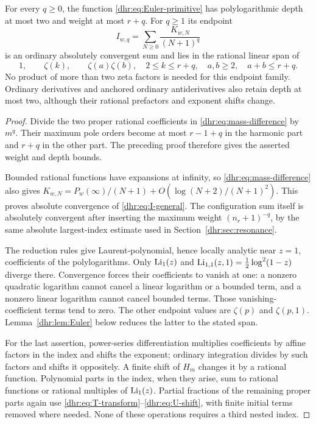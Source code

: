 \begin{corollary}
\label{dhr:cor:endpoint}
For every $q\geq0$, the function \eqref{dhr:eq:Euler-primitive} has
polylogarithmic depth at most two and weight at most $r+q$.
For $q\geq1$ its endpoint
\begin{equation}\label{dhr:eq:I-general}
 I_{w,q}=\sum_{N\geq0}\frac{K_{w,N}}{(N+1)^q}
\end{equation}
is an ordinary absolutely convergent sum and lies in the rational
linear span of
\[
 1,\qquad \zeta(k),\qquad \zeta(a)\zeta(b),
 \quad 2\leq k\leq r+q,\quad a,b\geq2,\quad a+b\leq r+q.
\]
No product of more than two zeta factors is needed for this endpoint
family. Ordinary derivatives and anchored ordinary antiderivatives
also retain depth at most two, although their rational prefactors
and exponent shifts change.
\end{corollary}

\begin{proof}
Divide the two proper rational coefficients in
\eqref{dhr:eq:mass-difference} by $m^q$. Their maximum pole orders
become at most $r-1+q$ in the harmonic part and $r+q$ in the other
part. The preceding proof therefore gives the asserted weight and
depth bounds.

Bounded rational functions have expansions at infinity, so
\eqref{dhr:eq:mass-difference} also gives
$K_{w,N}=P_w(\infty)/(N+1)+O(\log(N+2)/(N+1)^2)$.
This proves absolute convergence of \eqref{dhr:eq:I-general}.
The configuration sum itself is absolutely convergent after inserting
the maximum weight $(n_r+1)^{-q}$, by the same absolute
largest-index estimate used in Section~\ref{dhr:sec:resonance}.

The reduction rules give Laurent-polynomial, hence locally analytic
near $z=1$, coefficients of the polylogarithms. Only $\operatorname{Li}_1(z)$
and $\operatorname{Li}_{1,1}(z,1)=\tfrac12\log^2(1-z)$ diverge there. Convergence
forces their coefficients to vanish at one: a nonzero quadratic
logarithm cannot cancel a linear logarithm or a bounded term, and
a nonzero linear logarithm cannot cancel bounded terms. Those
vanishing-coefficient terms tend to zero. The other endpoint values
are $\zeta(p)$ and $\zeta(p,1)$. Lemma~\ref{dhr:lem:Euler} below
reduces the latter to the stated span.

For the last assertion, power-series differentiation multiplies
coefficients by affine factors in the index and shifts the exponent;
ordinary integration divides by such factors and shifts it oppositely.
A finite shift of $H_m$ changes it by a rational function. Polynomial
parts in the index, when they arise, sum to rational functions or
rational multiples of $\operatorname{Li}_1(z)$. Partial fractions of the remaining
proper parts again use \eqref{dhr:eq:T-transform}--\eqref{dhr:eq:U-shift},
with finite initial terms removed where needed. None of these operations
requires a third nested index.
\end{proof}

